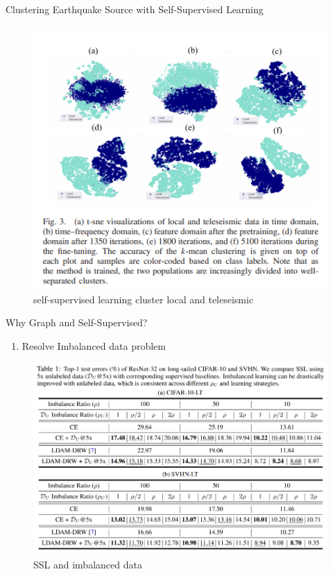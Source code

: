 \documentclass{beamer}
\newcounter{saveenumi}
\newcommand{\seti}{\setcounter{saveenumi}{\value{enumi}}}
\begin{document}
	\begin{frame}[t]{Clustering Earthquake Source with Self-Supervised Learning}
		\begin{figure}
			\includegraphics[scale=0.5]{self.png}
			\caption{self-supervised learning cluster local and teleseismic}
		\end{figure}
	\end{frame}

	\begin{frame}[t]{Why Graph and Self-Supervised?}
	\begin{enumerate}
		\item Resolve Imbalanced data problem
		\seti
	\end{enumerate}
	\begin{figure}
		\includegraphics[scale=0.3]{result.png}
		\caption{SSL and imbalanced data}
	\end{figure}
	\end{frame}
\end{document}
